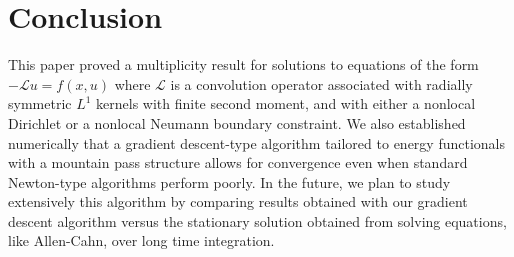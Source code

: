 \documentclass[11pt]{amsart}   	%
\theoremstyle{plain}
\numberwithin{equation}{section}
\def\R{\mathbb{R}}
\def\Lin{\mathcal{L}}
\def\exp{\text{exp}}
\begin{document}

\section{Conclusion}\label{s:conclusion}

This paper proved a multiplicity result for solutions to equations of the form $-\Lin u = f(x, u)$ where $\Lin$ is a convolution operator associated with radially symmetric $L^1$ kernels with finite second moment,
 and with either a nonlocal Dirichlet or a nonlocal Neumann boundary constraint. We also established numerically that a gradient descent-type algorithm tailored to energy functionals with a mountain pass structure allows for convergence even when standard Newton-type algorithms perform poorly. In the future, we plan to study extensively this algorithm by comparing results obtained with our gradient descent algorithm versus the stationary solution obtained from solving equations, like Allen-Cahn, over long time integration.
 
\end{document}
